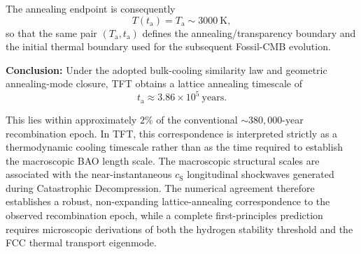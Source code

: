 The annealing endpoint is consequently
\begin{equation}
    T(t_{\mathrm a}) = T_{\mathrm a} \sim 3000\ \mathrm{K},
\end{equation}
so that the same pair $(T_{\mathrm a},t_{\mathrm a})$ defines the annealing/transparency boundary and the initial thermal boundary used for the subsequent Fossil-CMB evolution.

\vspace{0.5em}
\noindent\textbf{Conclusion:} Under the adopted bulk-cooling similarity law and geometric annealing-mode closure, TFT obtains a lattice annealing timescale of
\begin{equation}
    t_{\mathrm a} \approx 3.86 \times 10^5\ \mathrm{years}.
\end{equation}

This lies within approximately $2\%$ of the conventional $\sim 380{,}000$-year recombination epoch. In TFT, this correspondence is interpreted strictly as a thermodynamic cooling timescale rather than as the time required to establish the macroscopic BAO length scale. The macroscopic structural scales are associated with the near-instantaneous $c_{\mathrm S}$ longitudinal shockwaves generated during Catastrophic Decompression. The numerical agreement therefore establishes a robust, non-expanding lattice-annealing correspondence to the observed recombination epoch, while a complete first-principles prediction requires microscopic derivations of both the hydrogen stability threshold and the FCC thermal transport eigenmode.

